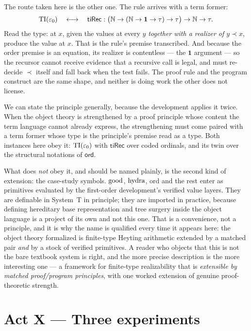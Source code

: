 The route taken here is the other one. The rule arrives with a term former:
\[
  \mathrm{TI}(\varepsilon_0)
  \quad\longleftrightarrow\quad
  \mathsf{tiRec} : \bigl(\mathbb{N} \to (\mathbb{N} \to \mathbf{1} \to \tau) \to
  \tau\bigr) \to \mathbb{N} \to \tau .
\]
Read the type: at $x$, given the values at every $y$ \emph{together with a
realizer of $y \prec x$}, produce the value at $x$. That is the rule's premise
transcribed. And because the order premise is an equation, its realizer is
contentless --- the $\mathbf{1}$ argument --- so the recursor cannot receive
evidence that a recursive call is legal, and must re-decide $\prec$ itself and
fall back when the test fails. The proof rule and the program construct are
the same shape, and neither is doing work the other does not license.

We can state the principle generally, because the development applies it
twice. When the object theory is strengthened by a proof principle whose
content the term language cannot already express, the strengthening must come
paired with a term former whose type is the principle's premise read as a
type. Both instances here obey it: $\mathrm{TI}(\varepsilon_0)$ with $\mathsf{tiRec}$
over coded ordinals, and its twin over the structural notations of
$\mathsf{ord}$.

What does \emph{not} obey it, and should be named plainly, is the second kind
of extension: the case-study symbols. $\operatorname{good}$, $\operatorname{hydra}$, $\mathrm{ord}$ and
the rest enter as primitives evaluated by the first-order development's
verified value layers. They are definable in System~T in principle; they are
imported in practice, because defining hereditary base representation and tree
surgery inside the object language is a project of its own and not this one.
That is a convenience, not a principle, and it is why the name \haomega{} is
qualified every time it appears here: the object theory formalized is
finite-type Heyting arithmetic extended by a matched pair \emph{and} by a
stock of verified primitives. A reader who objects that this is not the bare
textbook system is right, and the more precise description is the more
interesting one --- a framework for finite-type realizability that is
\emph{extensible by matched proof/program principles}, with one worked
extension of genuine proof-theoretic strength.

\section{Act X --- Three experiments}

